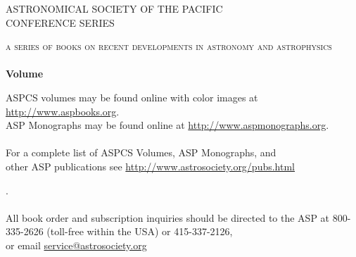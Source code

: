 \null
\setlength{\headheight}{0cm}
\setlength{\headsep}{0cm}
\setlength{\textheight}{21.6cm}
\setlength{\footskip}{0cm}
\pagestyle{empty}
\begin{center}
{\large{ASTRONOMICAL SOCIETY OF THE PACIFIC\\
\vspace{3pt}
CONFERENCE SERIES}}\\
\end{center}
\begin{center}
{\scshape a series of books on recent developments in astronomy and astrophysics}\\
\medskip
{\bfseries
\hrulefill\\
{Volume~\volume\\}
\vspace{-0.22truecm}
\hrulefill
}
\end{center}
\vfill

\aspeditorialstaff

\bigskip

\aspaddress

\vfill

\asppubcommittee

\vfill
\vspace{0.1in}
\begin{center}
{\small

ASPCS volumes may be found online with color images at \url{http://www.aspbooks.org}.\\
ASP Monographs may be found online at \url{http://www.aspmonographs.org}.\\ \hfill\\
\vspace{.1in}
For a complete list of ASPCS Volumes, ASP Monographs, and\\
other ASP publications see
\url{http://www.astrosociety.org/pubs.html}}.\\ \hfill\\
\vspace{0.1in}
All book order and subscription inquiries should be directed to the ASP at 
800-335-2626 (toll-free within the USA) or 415-337-2126,\\ 
or email \url{service@astrosociety.org}
\end{center}
\eject\pagebreak
